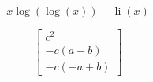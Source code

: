 



$$x \log{\left(\log{\left(x \right)} \right)} - \operatorname{li}{\left(x \right)}$$ 

$$\left[\begin{matrix}c^{2}\\- c \left(a - b\right)\\- c \left(- a + b\right)\end{matrix}\right]$$ 




